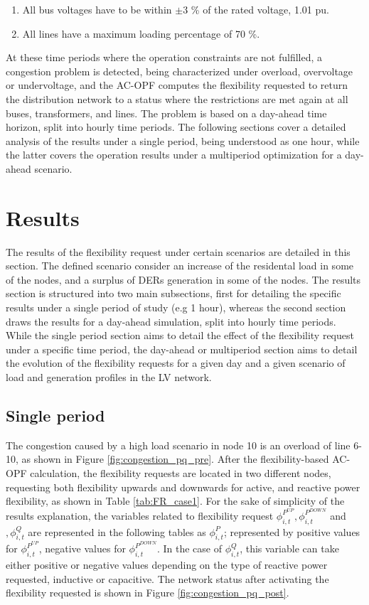 \begin{enumerate}
\item All bus voltages have to be within $\pm 3$ \% of the rated voltage, 1.01 pu.
\item All lines have a maximum loading percentage of 70 \%. 
\end{enumerate}

At these time periods where the operation constraints are not fulfilled, a congestion problem is detected, being characterized under overload, overvoltage or undervoltage, and the AC-OPF computes the flexibility requested to return the distribution network to a status where the restrictions are met again at all buses, transformers, and lines. The problem is based on a day-ahead time horizon, split into hourly time periods. The following sections cover a detailed analysis of the results under a single period, being understood as one hour, while the latter covers the operation results under a multiperiod optimization for a day-ahead scenario.  

\section{Results}
The results of the flexibility request under certain scenarios are detailed in this section. The defined scenario consider an increase of the residental load in some of the nodes, and a surplus of DERs generation in some of the nodes. The results section is structured into two main subsections, first for detailing the specific results under a single period of study (e.g 1 hour), whereas the second section draws the results for a day-ahead simulation, split into hourly time periods. While the single period section aims to detail the effect of the flexibility request under a specific time period, the day-ahead or multiperiod section aims to detail the evolution of the flexibility requests for a given day and a given scenario of load and generation profiles in the LV network. 
\subsection{Single period}
The congestion caused by a high load scenario in node 10 is an overload of line 6-10, as shown in Figure \ref{fig:congestion_pq_pre}. After the flexibility-based AC-OPF calculation, the flexibility requests are located in two different nodes, requesting both flexibility upwards and downwards for active, and reactive power flexibility, as shown in Table \ref{tab:FR_case1}. For the sake of simplicity of the results explanation, the variables related to flexibility request $\phi_{i,t}^{P^{UP}},\phi_{i,t}^{P^{DOWN}}$ and $,\phi_{i,t}^{Q}$ are represented in the following tables as $\phi_{i,t}^{P}$; represented by positive values for $\phi_{i,t}^{P^{UP}}$, negative values for $\phi_{i,t}^{P^{DOWN}}$. In the case of $\phi_{i,t}^{Q}$, this variable can take either positive or negative values depending on the type of reactive power requested, inductive or capacitive. The network status after activating the flexibility requested is shown in Figure \ref{fig:congestion_pq_post}.

